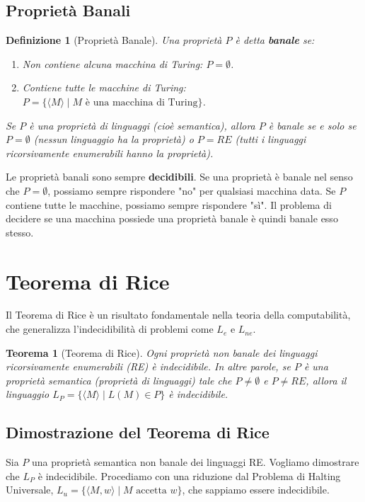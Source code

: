 \documentclass[a4paper]{article}
\newtheorem{theorem}{Teorema}
\newtheorem{definition}{Definizione}
\begin{document}
\subsection{Proprietà Banali}

\begin{definition}[Proprietà Banale]
Una proprietà $P$ è detta \textbf{banale} se:
\begin{enumerate}
    \item Non contiene alcuna macchina di Turing: $P = \emptyset$.
    \item Contiene tutte le macchine di Turing: $P = \{\langle M \rangle \mid M \text{ è una macchina di Turing}\}$.
\end{enumerate}
Se $P$ è una proprietà di linguaggi (cioè semantica), allora $P$ è banale se e solo se $P = \emptyset$ (nessun linguaggio ha la proprietà) o $P = RE$ (tutti i linguaggi ricorsivamente enumerabili hanno la proprietà).
\end{definition}

Le proprietà banali sono sempre \textbf{decidibili}. Se una proprietà è banale nel senso che $P = \emptyset$, possiamo sempre rispondere "no" per qualsiasi macchina data. Se $P$ contiene tutte le macchine, possiamo sempre rispondere "sì". Il problema di decidere se una macchina possiede una proprietà banale è quindi banale esso stesso.

\section{Teorema di Rice}

Il Teorema di Rice è un risultato fondamentale nella teoria della computabilità, che generalizza l'indecidibilità di problemi come $L_e$ e $L_{ne}$.

\begin{theorem}[Teorema di Rice]
Ogni proprietà non banale dei linguaggi ricorsivamente enumerabili (RE) è indecidibile.
In altre parole, se $P$ è una proprietà semantica (proprietà di linguaggi) tale che $P \neq \emptyset$ e $P \neq RE$, allora il linguaggio $L_P = \{\langle M \rangle \mid L(M) \in P\}$ è indecidibile.
\end{theorem}

\subsection{Dimostrazione del Teorema di Rice}
Sia $P$ una proprietà semantica non banale dei linguaggi RE. Vogliamo dimostrare che $L_P$ è indecidibile. Procediamo con una riduzione dal Problema di Halting Universale, $L_u = \{\langle M,w \rangle \mid M \text{ accetta } w\}$, che sappiamo essere indecidibile.
\end{document}
